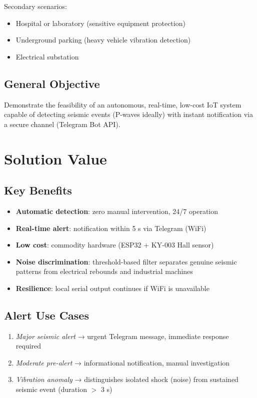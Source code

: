 \documentclass[11pt,a4paper]{article}
\begin{document}
Secondary scenarios:
\begin{itemize}[noitemsep]
  \item Hospital or laboratory (sensitive equipment protection)
  \item Underground parking (heavy vehicle vibration detection)
  \item Electrical substation
\end{itemize}

\subsection{General Objective}
Demonstrate the feasibility of an autonomous, real-time, low-cost IoT system capable of detecting seismic events (P-waves ideally) with instant notification via a secure channel (Telegram Bot API).

\section{Solution Value}

\subsection{Key Benefits}
\begin{itemize}[noitemsep]
  \item \textbf{Automatic detection}: zero manual intervention, 24/7 operation
  \item \textbf{Real-time alert}: notification within 5 s via Telegram (WiFi)
  \item \textbf{Low cost}: commodity hardware (ESP32 + KY-003 Hall sensor)
  \item \textbf{Noise discrimination}: threshold-based filter separates genuine seismic patterns from electrical rebounds and industrial machines
  \item \textbf{Resilience}: local serial output continues if WiFi is unavailable
\end{itemize}

\subsection{Alert Use Cases}
\begin{enumerate}[noitemsep]
  \item \textit{Major seismic alert} → urgent Telegram message, immediate response required
  \item \textit{Moderate pre-alert} → informational notification, manual investigation
  \item \textit{Vibration anomaly} → distinguishes isolated shock (noise) from sustained seismic event (duration $>$ 3 s)
\end{enumerate}
\end{document}
